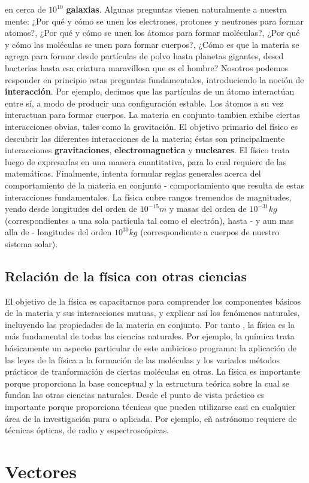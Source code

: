 \documentclass[12pt,a4paper]{book}
\begin{document}
    en cerca de $10^{10}$ \textbf{galaxias}. Algunas preguntas vienen naturalmente a nuestra mente: ¿Por qué y cómo se unen los electrones, protones y neutrones
    para formar atomos?, ¿Por qué y cómo se unen los átomos para formar moléculas?, ¿Por qué y cómo las moléculas se unen para formar cuerpos?, ¿Cómo es que la materia
    se agrega para formar desde partículas de polvo hasta planetas gigantes, desed bacterias hasta esa criatura maravillosa que es el hombre? Nosotros podemos
    responder en principio estas preguntas fundamentales, introduciendo la noción de \textbf{interacción}. Por ejemplo, decimos que las partículas de un átomo
    interactúan entre sí, a modo de producir una configuración estable. Los átomos a su vez interactuan para formar cuerpos. La materia en conjunto tambien exhibe
    ciertas interacciones obvias, tales como la gravitación. El objetivo primario del físico es descubrir las diferentes interacciones de la materia; éstas son
    principalmente interacciones \textbf{gravitaciones}, \textbf{electromagnetica} y \textbf{nucleares}. El físico trata luego de expresarlas en una manera
    cuantitativa, para lo cual requiere de las matemáticas. Finalmente, intenta formular reglas generales acerca del comportamiento de la materia en conjunto -
    comportamiento que resulta de estas interacciones fundamentales. La física cubre rangos tremendos de magnitudes, yendo desde longitudes del orden de
    $10^{-15}m$ y masas del orden de $10^{-31}kg$ (correspondientes a una sola partícula tal como el electrón), hasta - y aun mas alla de - longitudes del
    orden $10^{30}kg$ (correspondiente a cuerpos de nuestro sistema solar).

    \section{Relación de la física con otras ciencias}

    El objetivo de la física es capacitarnos para comprender los componentes básicos de la materia y sus interacciones mutuas, y explicar así los fenómenos naturales,
    incluyendo las propiedades de la materia en conjunto. Por tanto , la física es la más fundamental de todas las ciencias naturales. Por ejemplo, la química trata
    básicamente un aspecto particular de este ambicioso programa: la aplicación de las leyes de la física a la formación de las moléculas y los variados métodos
    prácticos de tranformación de ciertas moléculas en otras. La física es importante porque proporciona la base conceptual y la estructura teórica sobre la cual
    se fundan las otras ciencias naturales. Desde el punto de vista práctico es importante porque proporciona técnicas que pueden utilizarse casi en cualquier
    área de la investigación pura o aplicada. Por ejemplo, eñ astrónomo requiere de técnicas ópticas, de radio y espectroscópicas.

    \chapter{Vectores}
\end{document}
